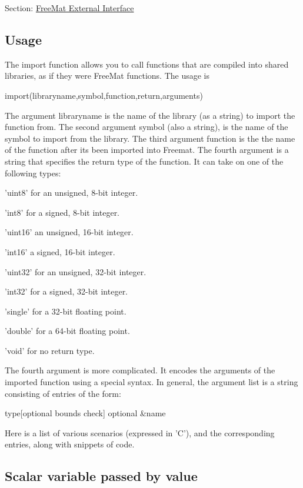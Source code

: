 Section\-: \hyperlink{sec_external}{Free\-Mat External Interface} \hypertarget{vtkwidgets_vtkxyplotwidget_Usage}{}\subsection{Usage}\label{vtkwidgets_vtkxyplotwidget_Usage}
The import function allows you to call functions that are compiled into shared libraries, as if they were Free\-Mat functions. The usage is \begin{DoxyVerb}  import(libraryname,symbol,function,return,arguments)
\end{DoxyVerb}
 The argument {\ttfamily libraryname} is the name of the library (as a string) to import the function from. The second argument {\ttfamily symbol} (also a string), is the name of the symbol to import from the library. The third argument {\ttfamily function} is the the name of the function after its been imported into Freemat. The fourth argument is a string that specifies the return type of the function. It can take on one of the following types\-: 
\begin{DoxyItemize}
\item 'uint8' for an unsigned, 8-\/bit integer.  
\item 'int8' for a signed, 8-\/bit integer.  
\item 'uint16' an unsigned, 16-\/bit integer.  
\item 'int16' a signed, 16-\/bit integer.  
\item 'uint32' for an unsigned, 32-\/bit integer.  
\item 'int32' for a signed, 32-\/bit integer.  
\item 'single' for a 32-\/bit floating point.  
\item 'double' for a 64-\/bit floating point.  
\item 'void' for no return type.  
\end{DoxyItemize}The fourth argument is more complicated. It encodes the arguments of the imported function using a special syntax. In general, the argument list is a string consisting of entries of the form\-:

\begin{DoxyVerb}  type[optional bounds check] {optional &}name
\end{DoxyVerb}


Here is a list of various scenarios (expressed in 'C'), and the corresponding entries, along with snippets of code.

\subsection*{Scalar variable passed by value}


